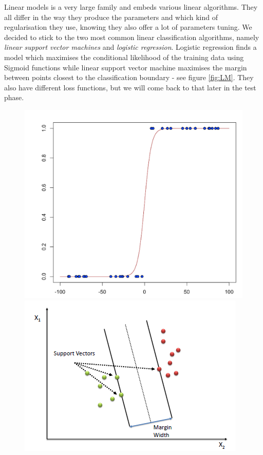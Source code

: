 Linear models is a very large family and embeds various linear algorithms. They all differ in the way they produce the parameters and which kind of regularisation they use, knowing they also offer a lot of parameters tuning. We decided to stick to the two most common linear classification algorithms, namely \textit{linear support vector machines} and \textit{logistic regression}. Logistic regression finds a model which maximises the conditional likelihood of the training data using Sigmoid functions while linear support vector machine maximises the margin between points closest to the classification boundary - see figure \ref{fig:LM}. They also have different loss functions, but we will come back to that later in the test phase.

\begin{figure}[ht]
\centering
    \begin{minipage}[b]{0.43\linewidth}
    \includegraphics[width=\linewidth]{Figures/LM1.png}
\end{minipage}
\quad
\begin{minipage}[b]{0.52\linewidth}
    \includegraphics[width=\linewidth]{Figures/LM2.png}

\end{minipage}
\end{figure}
